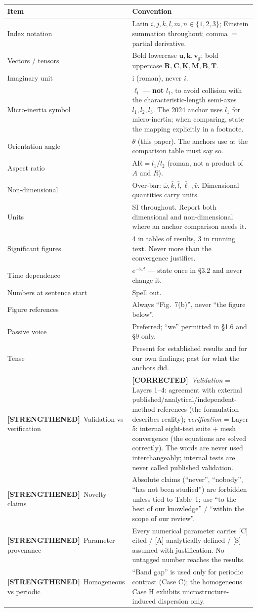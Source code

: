 \documentclass[11pt,a4paper]{article}
\newcommand{\STR}{{\color{strcol}\textbf{[STRENGTHENED]}}}
\newcommand{\COR}{{\color{corcol}\textbf{[CORRECTED]}}}
\begin{document}
\begin{tabularx}{\textwidth}{@{}L{4.2cm} Y@{}}
\toprule
Item & Convention \\
\midrule
Index notation & Latin $i,j,k,l,m,n\in\{1,2,3\}$; Einstein summation throughout; comma $=$ partial derivative. \\
Vectors / tensors & Bold lowercase $\bm u,\bm k,\bm v_{\mathrm g}$; bold uppercase $\bm R,\bm C,\bm K,\bm M,\bm B,\bm T$. \\
Imaginary unit & $\mathrm i$ (roman), never $i$. \\
Micro-inertia symbol & $\ell_{\mathrm i}$ --- \textbf{not} $l_1$, to avoid collision with the characteristic-length semi-axes $l_1,l_2,l_3$. \textcolor{warn}{The 2024 anchor uses $l_1$ for micro-inertia; when comparing, state the mapping explicitly in a footnote.} \\
Orientation angle & $\theta$ (this paper). The anchors use $\alpha$; the comparison table must say so. \\
Aspect ratio & $\mathrm{AR}=l_1/l_2$ (roman, not a product of $A$ and $R$). \\
Non-dimensional & Over-bar: $\bar\omega,\bar k,\bar l,\bar\ell_{\mathrm i},\bar v$. Dimensional quantities carry units. \\
Units & SI throughout. Report both dimensional and non-dimensional where an anchor comparison needs it. \\
Significant figures & 4 in tables of results, 3 in running text. Never more than the convergence justifies. \\
Time dependence & $e^{-\mathrm i\omega t}$ --- state once in \S3.2 and never change it. \\
Numbers at sentence start & Spell out. \\
Figure references & Always ``Fig.~7(b)'', never ``the figure below''. \\
Passive voice & Preferred; ``we'' permitted in \S1.6 and \S9 only. \\
Tense & Present for established results and for our own findings; past for what the anchors did. \\
\STR\ Validation vs verification & \COR\ \emph{Validation} = Layers 1--4: agreement with external published/analytical/independent-method references (the formulation describes reality); \emph{verification} = Layer 5: internal eight-test suite + mesh convergence (the equations are solved correctly). The words are never used interchangeably; internal tests are never called published validation. \\
\STR\ Novelty claims & Absolute claims (``never'', ``nobody'', ``has not been studied'') are forbidden unless tied to Table~1; use ``to the best of our knowledge'' / ``within the scope of our review''. \\
\STR\ Parameter provenance & Every numerical parameter carries [C] cited / [A] analytically defined / [S] assumed-with-justification. No untagged number reaches the results. \\
\STR\ Homogeneous vs periodic & ``Band gap'' is used only for periodic contrast (Case C); the homogeneous Case H exhibits microstructure-induced dispersion only. \\
\bottomrule
\end{tabularx}
\end{document}
